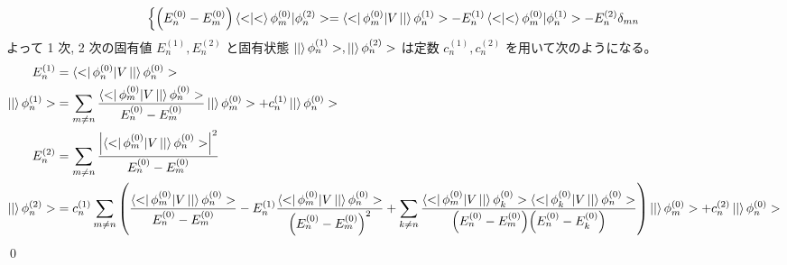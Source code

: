 \documentclass[uplatex,dvipdfmx,a4paper,11pt]{jlreq}
\makeatletter
\numberwithin{equation}{section}
\theoremstyle{definition}
\renewenvironment{proof}[1][\proofname]{\par
  \normalfont
  \topsep6\p@\@plus6\p@ \trivlist
  \item[\hskip\labelsep{\bfseries #1}\@addpunct{\bfseries}]\ignorespaces\quad\par
}{%
  \qed\endtrivlist\@endpefalse
}
\renewcommand\proofname{証明}
\makeatother
\begin{document}
\begin{proof}
\begin{align}
\begin{dcases}
             \qty(E_n^{(0)} - E_m^{(0)})\braket<\phi_m^{(0)}|\phi_n^{(2)}> = \bra<\phi_m^{(0)}|V\ket|\phi_n^{(1)}> - E_n^{(1)}\braket<\phi_m^{(0)}|\phi_n^{(1)}> - E_n^{(2)}\delta_{mn}
           \end{dcases}
  \end{align}
  よって 1 次, 2 次の固有値 $E_n^{(1)}, E_n^{(2)}$ と固有状態 $\ket|\phi_n^{(1)}>, \ket|\phi_n^{(2)}>$ は定数 $c_n^{(1)}, c_n^{(2)}$ を用いて次のようになる。
  \begin{align}
    E_n^{(1)}          & = \bra<\phi_n^{(0)}|V\ket|\phi_n^{(0)}>                                                                                                                                                                                                                                                                                                                                                             \\
    \ket|\phi_n^{(1)}> & = \sum_{m\neq n}\frac{\bra<\phi_m^{(0)}|V\ket|\phi_n^{(0)}>}{E_n^{(0)} - E_m^{(0)}}\ket|\phi_m^{(0)}> + c_n^{(1)}\ket|\phi_n^{(0)}>                                                                                                                                                                                                                                                                 \\
    E_n^{(2)}          & = \sum_{m\neq n}\frac{\qty|{\bra<\phi_m^{(0)}|V\ket|\phi_n^{(0)}>}|^2}{E_n^{(0)} - E_m^{(0)}}                                                                                                                                                                                                                                                                                                       \\
    \ket|\phi_n^{(2)}> & = c_n^{(1)}\sum_{m\neq n}\qty(\frac{\bra<\phi_m^{(0)}|V\ket|\phi_n^{(0)}>}{E_n^{(0)} - E_m^{(0)}} - E_n^{(1)}\frac{\bra<\phi_m^{(0)}|V\ket|\phi_n^{(0)}>}{\qty(E_n^{(0)} - E_m^{(0)})^2} + \sum_{k\neq n}\frac{\bra<\phi_m^{(0)}|V\ket|\phi_k^{(0)}>\bra<\phi_k^{(0)}|V\ket|\phi_n^{(0)}>}{\qty(E_n^{(0)} - E_m^{(0)})\qty(E_n^{(0)} - E_k^{(0)})})\ket|\phi_m^{(0)}> + c_n^{(2)}\ket|\phi_n^{(0)}>
  \end{align}
\end{proof}
\end{document}
